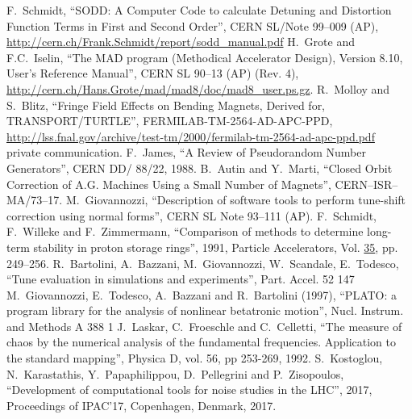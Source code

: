 \begin{thebibliography}{99}
        F.~Schmidt,
        ``SODD: A Computer Code to calculate Detuning and Distortion Function Terms in First and Second Order'',
        CERN SL/Note 99--009 (AP), \url{http://cern.ch/Frank.Schmidt/report/sodd\_manual.pdf}
        H.~Grote and F.C.~Iselin,
        ``The MAD program (Methodical Accelerator Design), Version 8.10, User's Reference Manual'',
        CERN SL 90--13 (AP) (Rev. 4), \url{http://cern.ch/Hans.Grote/mad/mad8/doc/mad8\_user.ps.gz}.
        R.~Molloy and S.~Blitz,
        ``Fringe Field Effects on Bending Magnets, Derived for, TRANSPORT/TURTLE'',
        FERMILAB-TM-2564-AD-APC-PPD, \url{http://lss.fnal.gov/archive/test-tm/2000/fermilab-tm-2564-ad-apc-ppd.pdf}
     private communication. %
        F.~James,
        ``A Review of Pseudorandom Number Generators'',
        CERN DD/ 88/22, 1988.
        B.~Autin and Y.~Marti,
        ``Closed Orbit Correction of A.G. Machines Using a Small Number of Magnets'',
        CERN--ISR--MA/73--17.
        M.~Giovannozzi,
        ``Description of software tools to perform tune-shift correction using normal forms'',
        CERN SL Note 93--111 (AP).
        F.~Schmidt, F.~Willeke and F.~Zimmermann,
        ``Comparison of methods to determine long-term stability in proton storage rings'',
        1991, Particle Accelerators, Vol. \underline{35}, pp. 249--256.  
        R.~Bartolini, A.~Bazzani, M.~Giovannozzi, W.~Scandale, E.~Todesco,
        ``Tune evaluation in simulations and experiments'',
        Part. Accel. 52 147
        M.~Giovannozzi, E.~Todesco, A.~Bazzani and R.~Bartolini (1997),
        ``PLATO: a program library for the analysis of nonlinear betatronic motion'',
        Nucl. Instrum. and Methods A 388 1
        J.~Laskar, C.~Froeschle and C.~Celletti,
        ``The measure of chaos by the numerical analysis of the fundamental frequencies. Application to the standard mapping'', 
        Physica D, vol. 56, pp 253-269, 1992.
        S.~Kostoglou, N.~Karastathis, Y.~Papaphilippou, D.~Pellegrini and P.~Zisopoulos,
        ``Development of computational tools for noise studies in the LHC'', 
        2017, Proceedings of IPAC'17, Copenhagen, Denmark, 2017.

\end{thebibliography}

